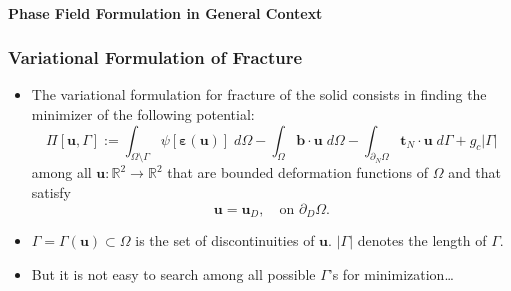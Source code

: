 \documentclass{beamer}
\newcommand{\SectionTwo}{Phase Field Formulation in General Context}
\begin{document}
\begin{frame}
	\framesubtitle{\SectionTwo}
	\frametitle{Variational Formulation of Fracture}
	\begin{itemize}
		\setlength\itemsep{2em}
		\item The variational formulation for fracture of the solid consists in finding the minimizer of the following potential:
		\begin{equation*}
		\Pi[\bm{u}, \Gamma] := \int_{\Omega\setminus\Gamma}\psi[\bm{\varepsilon}(\bm{u})]\; d\Omega - \int_{\Omega}\bm{b}\cdot\bm{u} \; d\Omega -
		\int_{\partial_N\Omega}\bm{t}_N\cdot \bm{u} \; d\Gamma + g_c|\Gamma|
		\end{equation*}
		among all $\bm{u}:\mathbb{R}^2\rightarrow\mathbb{R}^2$ that are bounded deformation functions of $\Omega$ and that satisfy
		\begin{equation*}
			\bm{u} = \bm{u}_D, \quad \text{on~} \partial_D\Omega.
		\end{equation*}
		\item $\Gamma=\Gamma(\bm{u})\subset\Omega$ is the set of discontinuities of $\bm{u}$. $|\Gamma|$ denotes the length of $\Gamma$.
		\item But it is not easy to search among all possible $\Gamma$'s for minimization\ldots
	\end{itemize}
\end{frame}
%
%
\end{document}

